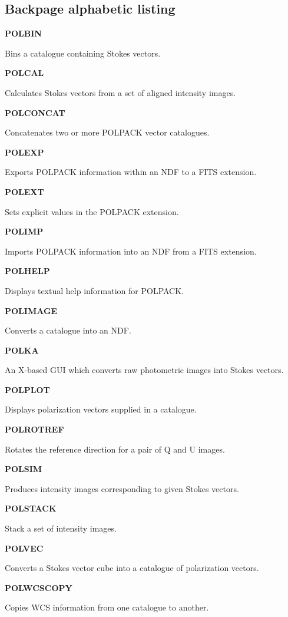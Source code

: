 \documentclass[twoside,11pt]{starlink}
\providecommand{\quickdes}[3]{
                         \parbox{1.1in}{\textbf{#1}}
                         \parbox{4.4in}{\raggedright #2 \dotfill}
                         \parbox{0.6in}{\pageref{#3}}
                         \vspace*{0.2in}}
\providecommand{\latexonlysection}[1]{\section{#1}}
\begin{document}
\begin{latexonly}

\cleardoublepage

\latexonlysection{Backpage alphabetic listing}

%
%

\quickdes{POLBIN}{Bins a catalogue containing Stokes vectors.}{POLBIN}

\quickdes{POLCAL}{Calculates Stokes vectors from a set of aligned intensity images.}{POLCAL}

\quickdes{POLCONCAT}{Concatenates two or more POLPACK vector catalogues.}{POLCONCAT}

\quickdes{POLEXP}{Exports POLPACK information within an NDF to a FITS extension.}{POLEXP}

\quickdes{POLEXT}{Sets explicit values in the POLPACK extension.}{POLEXT}

\quickdes{POLIMP}{Imports POLPACK information into an NDF from a FITS extension.}{POLEXP}

\quickdes{POLHELP}{Displays textual help information for POLPACK.}{POLHELP}

\quickdes{POLIMAGE}{Converts a catalogue into an NDF.}{POLIMAGE}

\quickdes{POLKA}{An X-based GUI which converts raw photometric images into Stokes vectors.}{POLKA}

\quickdes{POLPLOT}{Displays polarization vectors supplied in a catalogue.}{POLPLOT}

\quickdes{POLROTREF}{Rotates the reference direction for a pair of Q and U images.}{POLROTREF}

\quickdes{POLSIM}{Produces intensity images corresponding to given Stokes vectors.}{POLSIM}

\quickdes{POLSTACK}{Stack a set of intensity images.}{POLSTACK}

\quickdes{POLVEC}{Converts a Stokes vector cube into a catalogue of polarization vectors.}{POLVEC}

\quickdes{POLWCSCOPY}{Copies WCS information from one catalogue to another.}{POLWCSCOPY}

\end{latexonly}
\end{document}

